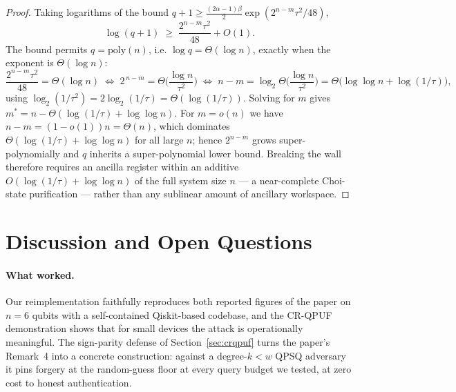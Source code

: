 \documentclass[11pt]{article}
\begin{document}
\begin{proof}
Taking logarithms of the bound $q + 1 \ge \tfrac{(2\alpha-1)\beta}{2}
\exp(2^{n-m}\tau^2/48)$,
\[
  \log(q+1) \;\ge\; \frac{2^{n-m}\tau^2}{48} + O(1).
\]
The bound permits $q = \mathrm{poly}(n)$, i.e. $\log q = \Theta(\log n)$,
exactly when the exponent is $\Theta(\log n)$:
\[
  \frac{2^{n-m}\tau^2}{48} = \Theta(\log n)
  \;\Longleftrightarrow\;
  2^{\,n-m} = \Theta\!\Big(\frac{\log n}{\tau^2}\Big)
  \;\Longleftrightarrow\;
  n - m = \log_2\Theta\!\Big(\frac{\log n}{\tau^2}\Big)
        = \Theta\!\big(\log\log n + \log(1/\tau)\big),
\]
using $\log_2(1/\tau^2) = 2\log_2(1/\tau) = \Theta(\log(1/\tau))$. Solving for
$m$ gives $m^\ast = n - \Theta(\log(1/\tau) + \log\log n)$. For
$m = o(n)$ we have $n - m = (1-o(1))n = \Theta(n)$, which dominates
$\Theta(\log(1/\tau)+\log\log n)$ for all large $n$; hence $2^{n-m}$ grows
super-polynomially and $q$ inherits a super-polynomial lower bound. Breaking
the wall therefore requires an ancilla register within an additive
$O(\log(1/\tau) + \log\log n)$ of the full system size $n$ --- a near-complete
Choi-state purification --- rather than any sublinear amount of ancillary
workspace.
\end{proof}

\section{Discussion and Open Questions}\label{sec:discussion}

\paragraph{What worked.}
Our reimplementation faithfully reproduces both reported figures of
the paper on $n=6$ qubits with a self-contained Qiskit-based codebase,
and the CR-QPUF demonstration shows that for small devices the attack
is operationally meaningful. The sign-parity defense of
Section~\ref{sec:crqpuf} turns the paper's Remark~4 into a concrete
construction: against a degree-$k < w$ QPSQ adversary it pins forgery
at the random-guess floor at every query budget we tested, at zero
cost to honest authentication.
\end{document}
